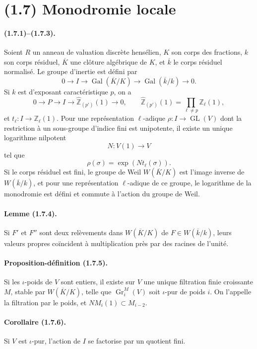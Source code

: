 \documentclass[11pt]{article}
\theoremstyle{remark}
\newcommand{\ZZ}{\mathbb{Z}}
\newcommand{\Gr}{\operatorname{Gr}}
\newcommand{\GL}{\operatorname{GL}}
\newcommand{\Gal}{\operatorname{Gal}}
\begin{document}
\section*{(1.7) Monodromie locale}

\paragraph{(1.7.1)--(1.7.3).}
Soient $R$ un anneau de valuation discrète hensélien, $K$ son corps des fractions, $k$ son corps résiduel, $\overline K$ une clôture algébrique de $K$, et $\overline k$ le corps résiduel normalisé. Le groupe d'inertie est défini par
\begin{equation}\tag{1.7.1.1}
0\to I\to\Gal(\overline K/K)\to\Gal(\overline k/k)\to0.
\end{equation}
Si $k$ est d'exposant caractéristique $p$, on a
\[
0\to P\to I\to \widehat{\ZZ}_{(p')}(1)\to0,
\qquad
\widehat{\ZZ}_{(p')}(1)=\prod_{\ell\ne p}\ZZ_\ell(1),
\]
et $t_\ell:I\to\ZZ_\ell(1)$. Pour une représentation $\ell$-adique $\rho:I\to\GL(V)$ dont la restriction à un sous-groupe d'indice fini est unipotente, il existe un unique logarithme nilpotent
\[
N:V(1)\to V
\]
tel que
\begin{equation}\tag{1.7.2.2}
\rho(\sigma)=\exp(Nt_\ell(\sigma)).
\end{equation}
Si le corps résiduel est fini, le groupe de Weil $W(\overline K/K)$ est l'image inverse de $W(\overline k/k)$, et pour une représentation $\ell$-adique de ce groupe, le logarithme de la monodromie est défini et commute à l'action du groupe de Weil.

\paragraph{Lemme (1.7.4).}
Si $F'$ et $F''$ sont deux relèvements dans $W(\overline K/K)$ de $F\in W(\overline k/k)$, leurs valeurs propres coïncident à multiplication près par des racines de l'unité.

\paragraph{Proposition-définition (1.7.5).}
Si les $\iota$-poids de $V$ sont entiers, il existe sur $V$ une unique filtration finie croissante $M$, stable par $W(\overline K/K)$, telle que $\Gr^M_i(V)$ soit $\iota$-pur de poids $i$. On l'appelle la filtration par le poids, et $NM_i(1)\subset M_{i-2}$.

\paragraph{Corollaire (1.7.6).}
Si $V$ est $\iota$-pur, l'action de $I$ se factorise par un quotient fini.
\end{document}
